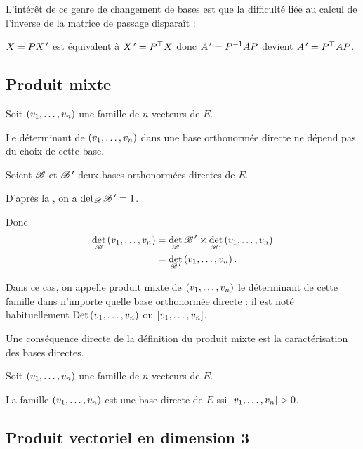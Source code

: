 L'intérêt de ce genre de changement de bases est que la difficulté liée au calcul de l'inverse de la matrice de passage disparaît :

\(X=PX^{\,\prime}\) est équivalent à \(X^{\,\prime}=P^{\top}X\) donc \(A^{\,\prime}=P^{-1} AP\) devient \(A^{\,\prime}=P^{\top}AP\).

\subsection{Produit mixte}

\begin{prop}
Soit \(\left(v_1,\dots,v_n\right)\) une famille de \(n\) vecteurs de \(E\).

Le déterminant de \(\left(v_1,\dots,v_n\right)\) dans une base orthonormée directe ne dépend pas du choix de cette base.
\end{prop}

\begin{dem}
Soient \(\mathscr{B}\) et \(\mathscr{B}^{\,\prime}\) deux bases orthonormées directes de \(E\).

D'après la , on a \(\det_{\mathscr{B}}\mathscr{B}^{\,\prime}=1\).

Donc \[\begin{aligned}
\det_{\mathscr{B}}\left(v_1,\dots,v_n\right)&=\det_{\mathscr{B}}\mathscr{B}^{\,\prime}\times\det_{\mathscr{B}^{\,\prime}}\left(v_1,\dots,v_n\right) \\
&=\det_{\mathscr{B}^{\,\prime}}\left(v_1,\dots,v_n\right).
\end{aligned}\]
\end{dem}

Dans ce cas, on appelle produit mixte de \(\left(v_1,\dots,v_n\right)\) le déterminant de cette famille dans n'importe quelle base orthonormée directe : il est noté habituellement \(\operatorname{Det}\left(v_1,\dots,v_n\right)\) ou \(\left[v_1,\dots,v_n\right]\).

Une conséquence directe de la définition du produit mixte est la caractérisation des bases directes.

\begin{prop}
Soit \(\left(v_1,\dots,v_n\right)\) une famille de \(n\) vecteurs de \(E\).

La famille \(\left(v_1,\dots,v_n\right)\) est une base directe de \(E\) ssi \(\left[v_1,\dots,v_n\right]>0\).
\end{prop}

\subsection{Produit vectoriel en dimension 3}

